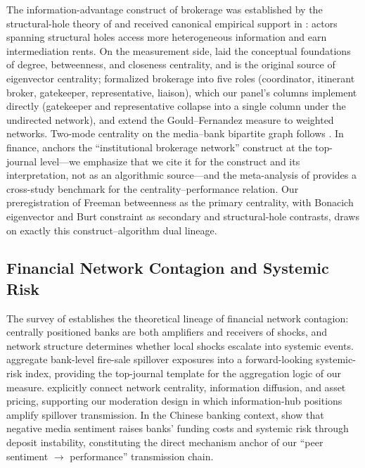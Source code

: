 The information-advantage construct of brokerage was established by
the structural-hole theory of \textcite{burt1992structural} and
received canonical empirical support in \textcite{burt2004structural}:
actors spanning structural holes access more heterogeneous
information and earn intermediation rents. On the measurement side,
\textcite{freeman1978centrality} laid the conceptual foundations of
degree, betweenness, and closeness centrality, and
\textcite{bonacich1972factoring} is the original source of
eigenvector centrality; \textcite{gould1989structures} formalized
brokerage into five roles (coordinator, itinerant broker,
gatekeeper, representative, liaison), which our panel's
 columns implement directly (gatekeeper and
representative collapse into a single column under the undirected
network), and
\textcite{zador2022weighted} extend the Gould--Fernandez measure to
weighted networks. Two-mode centrality on the media--bank bipartite
graph follows \textcite{borgatti1997network}. In finance,
\textcite{han2024brokerage} anchors the ``institutional brokerage
network'' construct at the top-journal level---we emphasize that we
cite it for the construct and its interpretation, not as an
algorithmic source---and the meta-analysis of
\textcite{nezami2025network} provides a cross-study benchmark for
the centrality--performance relation. Our preregistration of Freeman
betweenness as the primary centrality, with Bonacich eigenvector and
Burt constraint as secondary and structural-hole contrasts, draws on
exactly this construct--algorithm dual lineage.

\subsection{Financial Network Contagion and Systemic Risk}

The survey of \textcite{jackson2021systemic} establishes the
theoretical lineage of financial network contagion: centrally
positioned banks are both amplifiers and receivers of shocks, and
network structure determines whether local shocks escalate into
systemic events. \textcite{duarte2021firesale} aggregate bank-level
fire-sale spillover exposures into a forward-looking systemic-risk
index, providing the top-journal template for the aggregation logic
of our  measure.
\textcite{yu2024centrality} explicitly connect network centrality,
information diffusion, and asset pricing, supporting our moderation
design in which information-hub positions amplify spillover
transmission. In the Chinese banking context,
\textcite{fang2024media} show that negative media sentiment raises
banks' funding costs and systemic risk through deposit instability,
constituting the direct mechanism anchor of our
``peer sentiment $\to$ performance'' transmission chain.

